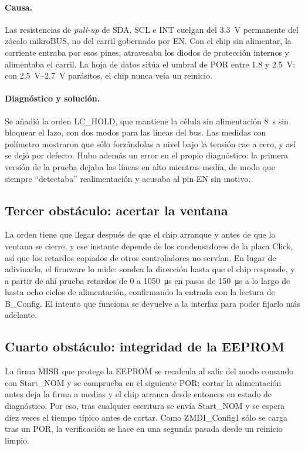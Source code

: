 \paragraph{Causa.} Las resistencias de \emph{pull-up} de SDA, SCL e INT cuelgan del
\SI{3.3}{\volt} permanente del zócalo mikroBUS, no del carril gobernado por EN. Con el chip sin
alimentar, la corriente entraba por esos pines, atravesaba los diodos de protección internos y
alimentaba el carril. La hoja de datos sitúa el umbral de POR entre \num{1.8} y \SI{2.5}{\volt}:
con \SIrange{2.5}{2.7}{\volt} parásitos, el chip nunca veía un reinicio.

\paragraph{Diagnóstico y solución.} Se añadió la orden LC\_HOLD, que mantiene la célula sin
alimentación \SI{8}{\second} sin bloquear el lazo, con dos modos para las líneas del bus. Las
medidas con polímetro mostraron que sólo forzándolas a nivel bajo la tensión cae a cero, y así se
dejó por defecto. Hubo además un error en el propio diagnóstico: la primera versión de la prueba
dejaba las líneas en alto mientras medía, de modo que siempre ``detectaba'' realimentación y acusaba
al pin EN sin motivo.

\subsection{Tercer obstáculo: acertar la ventana}

La orden tiene que llegar después de que el chip arranque y antes de que la ventana se cierre, y ese
instante depende de los condensadores de la placa Click, así que los retardos copiados de otros
controladores no servían. En lugar de adivinarlo, el firmware lo mide: sondea la dirección hasta que
el chip responde, y a partir de ahí prueba retardos de \num{0} a \SI{1050}{\micro\second} en pasos
de \SI{150}{\micro\second} a lo largo de hasta ocho ciclos de alimentación, confirmando la entrada
con la lectura de B\_Config. El intento que funciona se devuelve a la interfaz para poder fijarlo
más adelante.

\subsection{Cuarto obstáculo: integridad de la EEPROM}

La firma MISR que protege la EEPROM se recalcula al salir del modo comando con Start\_NOM y se
comprueba en el siguiente POR: cortar la alimentación antes deja la firma a medias y el chip arranca
desde entonces en estado de diagnóstico. Por eso, tras cualquier escritura se envía Start\_NOM y se
espera diez veces el tiempo típico antes de cortar. Como ZMDI\_Config1 sólo se carga tras un POR, la
verificación se hace en una segunda pasada desde un reinicio limpio.

